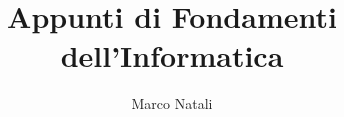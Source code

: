 \documentclass[a4paper,11pt,fleqn]{report}
\begin{document}
\author{Marco Natali}
\title{Appunti di Fondamenti dell'Informatica}
\maketitle
\date{}
\tableofcontents

\end{document}
